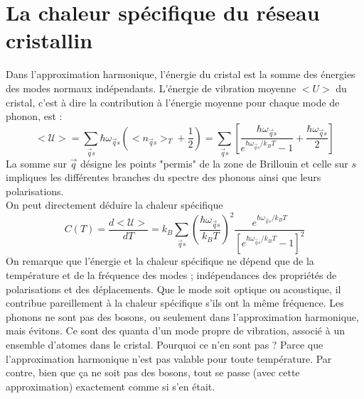 \section{La chaleur spécifique du réseau cristallin}
Dans l'approximation harmonique, l'énergie du cristal est la somme des énergies 
des modes normaux indépendants. L'énergie de vibration moyenne $<U>$ du cristal, 
c'est à dire la contribution à l'énergie moyenne pour chaque mode de phonon,
est :
\begin{equation}
<\mathcal{U}> = \sum_{\vec{q}s} \hbar\omega_{\vec qs}\left(<n_{\vec{q}s}>_T+
\dfrac{1}{2}\right) = \sum_{\vec{q}s} \left[\dfrac{\hbar\omega_{\vec{q}s}}{
e^{\hbar\omega_{\vec qs}/k_BT}-1}+\dfrac{\hbar\omega_{\vec{q}s}}{2}\right]
\end{equation}
La somme sur $\vec{q}$ désigne les points "permis" de la zone de Brillouin et 
celle sur $s$ impliques les différentes branches du spectre des phonons ainsi 
que leurs polarisations.\\
On peut directement déduire la chaleur spécifique
\begin{equation}
C(T) = \dfrac{d<\mathcal{U}>}{dT} = k_B\sum_{\vec{q}s}\left(\dfrac{\hbar 
\omega_{\vec{q}s}}{k_BT}\right)^2\dfrac{e^{\hbar\omega_{\vec{q}s}/k_BT}}{
\left[e^{\hbar\omega_{\vec{q}s}/k_BT}-1\right]^2}
\end{equation}
On remarque que l'énergie et la chaleur spécifique ne dépend que de la 
température et de la fréquence des modes ; indépendances des propriétés de 
polarisations et des déplacements. Que le mode soit optique ou acoustique, 
il contribue pareillement à la chaleur spécifique s'ils ont la même 
fréquence.
\newpage
\danger Les phonons ne sont pas des bosons, ou seulement dans l'approximation 
harmonique, mais évitons. Ce sont des quanta d'un mode propre de vibration, 
associé à un ensemble d'atomes dans le cristal. Pourquoi ce n'en sont pas ? 
Parce que l'approximation harmonique n'est pas valable pour toute température. 
Par contre, bien que ça ne soit pas des bosons, tout se passe (avec cette 
approximation) exactement comme si s'en était.\\

